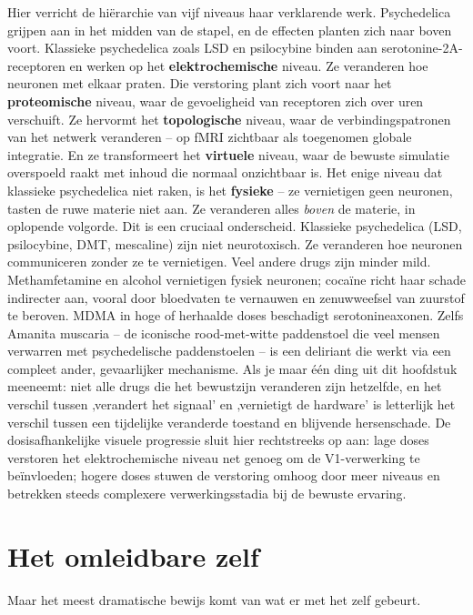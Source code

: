 \documentclass[11pt, twoside, openright]{book}
\begin{document}
Hier verricht de hiërarchie van vijf niveaus haar verklarende werk. Psychedelica grijpen aan in het midden van de stapel, en de effecten planten zich naar boven voort. Klassieke psychedelica zoals LSD en psilocybine binden aan serotonine-2A-receptoren en werken op het \textbf{elektrochemische} niveau. Ze veranderen hoe neuronen met elkaar praten. Die verstoring plant zich voort naar het \textbf{proteomische} niveau, waar de gevoeligheid van receptoren zich over uren verschuift. Ze hervormt het \textbf{topologische} niveau, waar de verbindingspatronen van het netwerk veranderen -- op fMRI zichtbaar als toegenomen globale integratie. En ze transformeert het \textbf{virtuele} niveau, waar de bewuste simulatie overspoeld raakt met inhoud die normaal onzichtbaar is. Het enige niveau dat klassieke psychedelica niet raken, is het \textbf{fysieke} -- ze vernietigen geen neuronen, tasten de ruwe materie niet aan. Ze veranderen alles \textit{boven} de materie, in oplopende volgorde. Dit is een cruciaal onderscheid. Klassieke psychedelica (LSD, psilocybine, DMT, mescaline) zijn niet neurotoxisch. Ze veranderen hoe neuronen communiceren zonder ze te vernietigen. Veel andere drugs zijn minder mild. Methamfetamine en alcohol vernietigen fysiek neuronen; cocaïne richt haar schade indirecter aan, vooral door bloedvaten te vernauwen en zenuwweefsel van zuurstof te beroven. MDMA in hoge of herhaalde doses beschadigt serotonineaxonen. Zelfs Amanita muscaria -- de iconische rood-met-witte paddenstoel die veel mensen verwarren met psychedelische paddenstoelen -- is een deliriant die werkt via een compleet ander, gevaarlijker mechanisme. Als je maar één ding uit dit hoofdstuk meeneemt: niet alle drugs die het bewustzijn veranderen zijn hetzelfde, en het verschil tussen ‚verandert het signaal' en ‚vernietigt de hardware' is letterlijk het verschil tussen een tijdelijke veranderde toestand en blijvende hersenschade. De dosisafhankelijke visuele progressie sluit hier rechtstreeks op aan: lage doses verstoren het elektrochemische niveau net genoeg om de V1-verwerking te beïnvloeden; hogere doses stuwen de verstoring omhoog door meer niveaus en betrekken steeds complexere verwerkingsstadia bij de bewuste ervaring.

\section*{Het omleidbare zelf}

Maar het meest dramatische bewijs komt van wat er met het zelf gebeurt.
\end{document}
